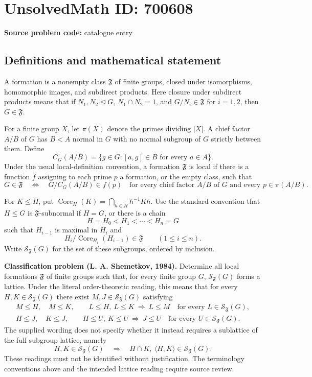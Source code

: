 \documentclass[11pt]{article}
\begin{document}
\section*{UnsolvedMath ID: 700608}
\textbf{Source problem code:} catalogue entry
\subsection{Definitions and mathematical statement}
A formation is a nonempty class \(\mathfrak F\) of finite groups, closed under isomorphisms, homomorphic images, and subdirect products. Here closure under subdirect products means that if \(N_1,N_2\trianglelefteq G\), \(N_1\cap N_2=1\), and \(G/N_i\in\mathfrak F\) for \(i=1,2\), then \(G\in\mathfrak F\).

For a finite group \(X\), let \(\pi(X)\) denote the primes dividing \(|X|\). A chief factor \(A/B\) of \(G\) has \(B<A\) normal in \(G\) with no normal subgroup of \(G\) strictly between them. Define
\[
C_G(A/B)=\{g\in G:[a,g]\in B\text{ for every }a\in A\}.
\]
Under the usual local-definition convention, a formation \(\mathfrak F\) is local if there is a function \(f\) assigning to each prime \(p\) a formation, or the empty class, such that
\[
G\in\mathfrak F
\quad\Longleftrightarrow\quad
G/C_G(A/B)\in f(p)
\quad\text{for every chief factor }A/B\text{ of }G
\text{ and every }p\in\pi(A/B).
\]

For \(K\leq H\), put \(\operatorname{Core}_H(K)=\bigcap_{h\in H}h^{-1}Kh\). Use the standard convention that \(H\leq G\) is \(\mathfrak F\)-subnormal if \(H=G\), or there is a chain
\[
H=H_0<H_1<\cdots<H_n=G
\]
such that \(H_{i-1}\) is maximal in \(H_i\) and
\[
H_i/\operatorname{Core}_{H_i}(H_{i-1})\in\mathfrak F
\qquad(1\leq i\leq n).
\]
Write \(\mathcal S_{\mathfrak F}(G)\) for the set of these subgroups, ordered by inclusion.

\textbf{Classification problem (L. A. Shemetkov, 1984).} Determine all local formations \(\mathfrak F\) of finite groups such that, for every finite group \(G\), \(\mathcal S_{\mathfrak F}(G)\) forms a lattice. Under the literal order-theoretic reading, this means that for every \(H,K\in\mathcal S_{\mathfrak F}(G)\) there exist \(M,J\in\mathcal S_{\mathfrak F}(G)\) satisfying
\[
\begin{gathered}
M\leq H,\quad M\leq K,\qquad
L\leq H,\ L\leq K\ \Longrightarrow\ L\leq M
\quad\text{for every }L\in\mathcal S_{\mathfrak F}(G),\\
H\leq J,\quad K\leq J,\qquad
H\leq U,\ K\leq U\ \Longrightarrow\ J\leq U
\quad\text{for every }U\in\mathcal S_{\mathfrak F}(G).
\end{gathered}
\]
The supplied wording does not specify whether it instead requires a sublattice of the full subgroup lattice, namely
\[
H,K\in\mathcal S_{\mathfrak F}(G)
\quad\Longrightarrow\quad
H\cap K,\ \langle H,K\rangle\in\mathcal S_{\mathfrak F}(G).
\]
These readings must not be identified without justification. The terminology conventions above and the intended lattice reading require source review.
\end{document}
